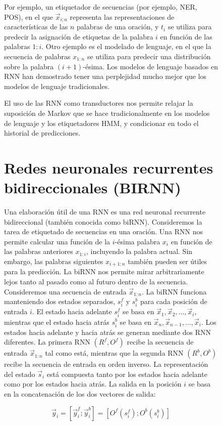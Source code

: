 \documentclass{book}
\begin{document}
\begin{figure}[h]
{Por ejemplo, un etiquetador de secuencias (por ejemplo, NER, POS), en el que $\vec{x}_{i:n}$ representa las representaciones de características de las $n$ palabras de una oración, y $t_i$ se utiliza para predecir la asignación de etiquetas de la palabra $i$ en función de las palabras $1:i$. Otro ejemplo es el modelado de lenguaje, en el que la secuencia de palabras $x_{1:n}$ se utiliza para predecir una distribución sobre la palabra $(i+1)$-ésima. Los modelos de lenguaje basados en RNN han demostrado tener una perplejidad mucho mejor que los modelos de lenguaje tradicionales.

El uso de las RNN como transductores nos permite relajar la suposición de Markov que se hace tradicionalmente en los modelos de lenguaje y los etiquetadores HMM, y condicionar en todo el historial de predicciones.

\section{Redes neuronales recurrentes bidireccionales (BIRNN)}

Una elaboración útil de una RNN es una red neuronal recurrente bidireccional (también conocida como biRNN). Consideremos la tarea de etiquetado de secuencias en una oración. Una RNN nos permite calcular una función de la $i$-ésima palabra $x_i$ en función de las palabras anteriores $x_{1:i}$, incluyendo la palabra actual. Sin embargo, las palabras siguientes $x_{i+1:n}$ también pueden ser útiles para la predicción. La biRNN nos permite mirar arbitrariamente lejos tanto al pasado como al futuro dentro de la secuencia. Consideremos una secuencia de entrada $\vec{x}_{1:n}$. La biRNN funciona manteniendo dos estados separados, $s_{i}^{f}$ y $s_{i}^{b}$ para cada posición de entrada $i$. El estado hacia adelante $s_{i}^{f}$ se basa en $\vec{x}_1, \vec{x}_2, \dots ,\vec{x}_i$, mientras que el estado hacia atrás $s_{i}^{b}$ se basa en $\vec{x}_n, \vec{x}_{n-1}, \dots ,\vec{x}_i$. Los estados hacia adelante y hacia atrás se generan mediante dos RNN diferentes. La primera RNN $(R^f, O^f)$ recibe la secuencia de entrada $\vec{x}_{1:n}$ tal como está, mientras que la segunda RNN $(R^b , O^b)$ recibe la secuencia de entrada en orden inverso. La representación del estado $\vec{s}_i$ está compuesta tanto por los estados hacia adelante como por los estados hacia atrás. La salida en la posición $i$ se basa en la concatenación de los dos vectores de salida:

\begin{displaymath}
\vec{y}_i = [\vec{y}_{i}^{f};\vec{y}_{i}^{b}]=[O^{f}(s_{i}^{f});O^{b}(s_{i}^{b})]
\end{displaymath}

}
\end{figure}
\end{document}
